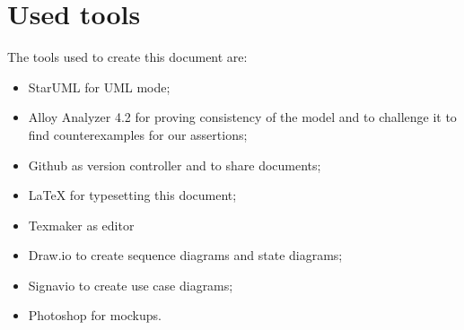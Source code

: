 \section{Used tools}
The tools used to create this document are:
\begin{itemize}
\item StarUML for UML mode;
\item Alloy Analyzer 4.2 for proving consistency of the model and to challenge it to find counterexamples for our assertions;
\item Github as version controller and to share documents;
\item LaTeX for typesetting this document;
\item Texmaker as editor
\item Draw.io to create sequence diagrams and state diagrams;
\item Signavio to create use case diagrams;
\item Photoshop for mockups.
\end{itemize}
%
